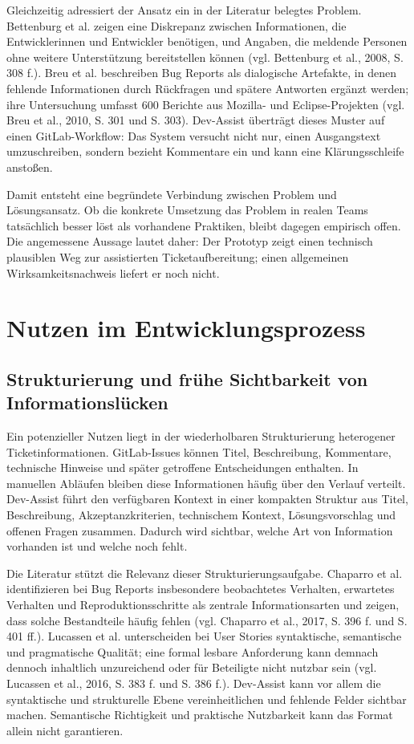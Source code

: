 Gleichzeitig adressiert der Ansatz ein in der Literatur belegtes Problem. Bettenburg et al. zeigen eine Diskrepanz zwischen Informationen, die Entwicklerinnen und Entwickler benötigen, und Angaben, die meldende Personen ohne weitere Unterstützung bereitstellen können (vgl. Bettenburg et al., 2008, S. 308 f.). Breu et al. beschreiben Bug Reports als dialogische Artefakte, in denen fehlende Informationen durch Rückfragen und spätere Antworten ergänzt werden; ihre Untersuchung umfasst 600 Berichte aus Mozilla- und Eclipse-Projekten (vgl. Breu et al., 2010, S. 301 und S. 303). Dev-Assist überträgt dieses Muster auf einen GitLab-Workflow: Das System versucht nicht nur, einen Ausgangstext umzuschreiben, sondern bezieht Kommentare ein und kann eine Klärungsschleife anstoßen.

Damit entsteht eine begründete Verbindung zwischen Problem und Lösungsansatz. Ob die konkrete Umsetzung das Problem in realen Teams tatsächlich besser löst als vorhandene Praktiken, bleibt dagegen empirisch offen. Die angemessene Aussage lautet daher: Der Prototyp zeigt einen technisch plausiblen Weg zur assistierten Ticketaufbereitung; einen allgemeinen Wirksamkeitsnachweis liefert er noch nicht.

\section{Nutzen im Entwicklungsprozess}

\subsection{Strukturierung und frühe Sichtbarkeit von Informationslücken}

Ein potenzieller Nutzen liegt in der wiederholbaren Strukturierung heterogener Ticketinformationen. GitLab-Issues können Titel, Beschreibung, Kommentare, technische Hinweise und später getroffene Entscheidungen enthalten. In manuellen Abläufen bleiben diese Informationen häufig über den Verlauf verteilt. Dev-Assist führt den verfügbaren Kontext in einer kompakten Struktur aus Titel, Beschreibung, Akzeptanzkriterien, technischem Kontext, Lösungsvorschlag und offenen Fragen zusammen. Dadurch wird sichtbar, welche Art von Information vorhanden ist und welche noch fehlt.

Die Literatur stützt die Relevanz dieser Strukturierungsaufgabe. Chaparro et al. identifizieren bei Bug Reports insbesondere beobachtetes Verhalten, erwartetes Verhalten und Reproduktionsschritte als zentrale Informationsarten und zeigen, dass solche Bestandteile häufig fehlen (vgl. Chaparro et al., 2017, S. 396 f. und S. 401 ff.). Lucassen et al. unterscheiden bei User Stories syntaktische, semantische und pragmatische Qualität; eine formal lesbare Anforderung kann demnach dennoch inhaltlich unzureichend oder für Beteiligte nicht nutzbar sein (vgl. Lucassen et al., 2016, S. 383 f. und S. 386 f.). Dev-Assist kann vor allem die syntaktische und strukturelle Ebene vereinheitlichen und fehlende Felder sichtbar machen. Semantische Richtigkeit und praktische Nutzbarkeit kann das Format allein nicht garantieren.

